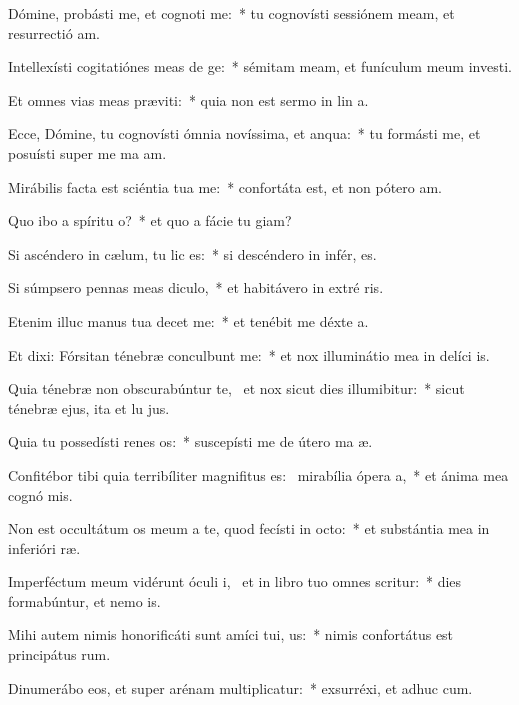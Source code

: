 \item Dómine, probásti me, et cognoti me:~* tu cognovísti sessiónem meam, et resurrectió am.
\item Intellexísti cogitatiónes meas de ge:~* sémitam meam, et funículum meum investi.
\item Et omnes vias meas præviti:~* quia non est sermo in lin a.
\item Ecce, Dómine, tu cognovísti ómnia novíssima, et anqua:~* tu formásti me, et posuísti super me ma am.
\item Mirábilis facta est sciéntia tua  me:~* confortáta est, et non pótero  am.
\item Quo ibo a spíritu o?~* et quo a fácie tu giam?
\item Si ascéndero in cælum, tu lic es:~* si descéndero in infér, es.
\item Si súmpsero pennas meas diculo,~* et habitávero in extré ris.
\item Etenim illuc manus tua decet me:~* et tenébit me déxte a.
\item Et dixi: Fórsitan ténebræ conculbunt me:~* et nox illuminátio mea in delíci is.
\item Quia ténebræ non obscurabúntur  te,~\pscross{} et nox sicut dies illumibitur:~* sicut ténebræ ejus, ita et lu jus.
\item Quia tu possedísti renes os:~* suscepísti me de útero ma æ.
\item Confitébor tibi quia terribíliter magnifitus es:~\pscross{} mirabília ópera a,~* et ánima mea cognó mis.
\item Non est occultátum os meum a te, quod fecísti in octo:~* et substántia mea in inferióri ræ.
\item Imperféctum meum vidérunt óculi i,~\pscross{} et in libro tuo omnes scritur:~* dies formabúntur, et nemo  is.
\item Mihi autem nimis honorificáti sunt amíci tui, us:~* nimis confortátus est principátus rum.
\item Dinumerábo eos, et super arénam multiplicatur:~* exsurréxi, et adhuc  cum.
